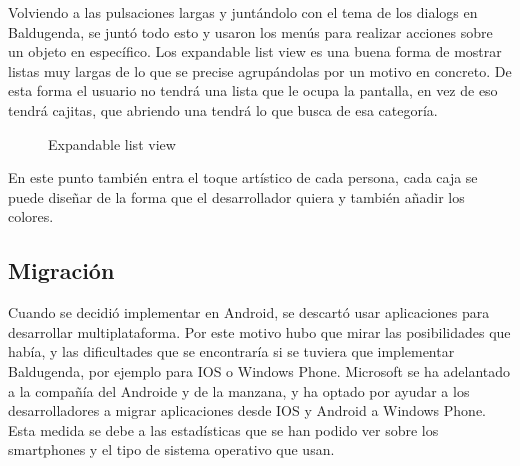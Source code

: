 Volviendo a las pulsaciones largas y juntándolo con el tema de los dialogs en Baldugenda, se juntó todo esto y usaron los menús para realizar acciones sobre un objeto en específico.
Los expandable list view es una buena forma de mostrar listas muy largas de lo que se precise agrupándolas por un motivo en concreto.
De esta forma el usuario no tendrá una lista que le ocupa la pantalla, en vez de eso tendrá cajitas, que abriendo una tendrá lo que busca de esa categoría.


\begin{figure}[H] 
  \begin{center} 
    \caption{Expandable list view} 
    \label{fig:ExpandableList} 
  \end{center} 
\end{figure}

En este punto también entra el toque artístico de cada persona, cada caja se puede diseñar de la forma que el desarrollador quiera y también añadir los colores.

\subsection{Migración}
\label{subsecc:Migración}

Cuando se decidió implementar en Android, se descartó usar aplicaciones para desarrollar multiplataforma.
Por este motivo hubo que mirar las posibilidades que había, y las dificultades que se encontraría si se tuviera que implementar Baldugenda, por ejemplo para IOS o Windows Phone.
Microsoft se ha adelantado a la compañía del Androide y de la manzana, y ha optado por ayudar a los desarrolladores a migrar aplicaciones desde IOS y Android a Windows Phone.
Esta medida se debe a las estadísticas que se han podido ver sobre los smartphones y el tipo de sistema operativo que usan.


